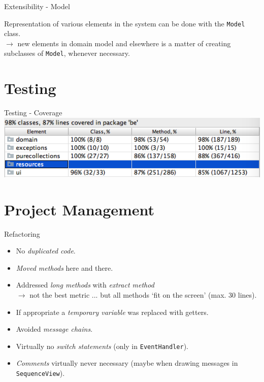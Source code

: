 \documentclass[10pt]{beamer}
\begin{document}
\begin{frame}[fragile]{Extensibility - Model}
	\begin{center}
	Representation of various elements in the system can be done with the \texttt{Model} class.\\
	$\rightarrow $ new elements in domain model and elsewhere is a matter of creating subclasses of \texttt{Model}, whenever necessary.
	\end{center}
\end{frame}

\section{Testing}

\begin{frame}[fragile]{Testing - Coverage}
	\includegraphics[width=1\textwidth]{coverage}
\end{frame}

\section{Project Management}


\begin{frame}[fragile]{Refactoring}
\begin{itemize}
\item No \textit{duplicated code}.
\item \textit{Moved methods} here and there.
\item Addressed \textit{long methods} with \textit{extract method} \\
$\rightarrow$ not the best metric ... but all methods `fit on the screen' (max. 30 lines).
\item If appropriate a \textit{temporary variable} was replaced with getters.
\item Avoided \textit{message chains}.
\item Virtually no \textit{switch statements} (only in \texttt{EventHandler}).
\item \textit{Comments} virtually never necessary (maybe when drawing messages in \texttt{SequenceView}).
\end{itemize}
\end{frame}
\end{document}
